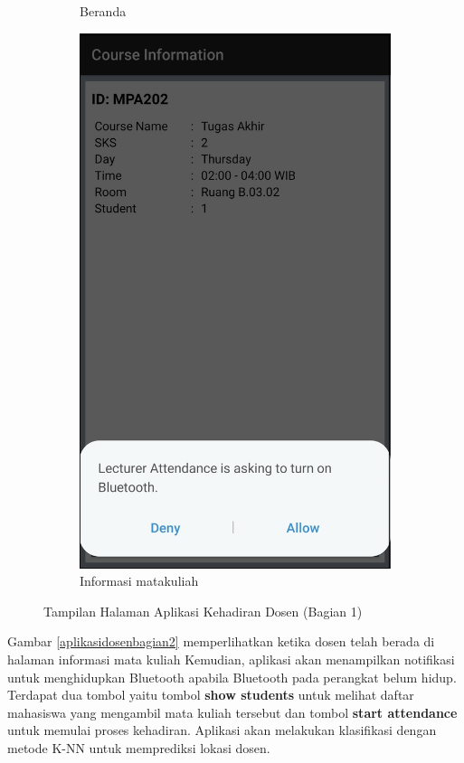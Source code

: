 \begin{enumerate}[a.]
\begin{enumerate}[a.]
\begin{figure} [H]
\begin{subfigure}{.5\textwidth}
			      \caption{Beranda}
		      \end{subfigure}
		      \begin{subfigure}{.5\textwidth}
			      \centering
			      \includegraphics[width=.5\linewidth]{gambar/android/dosen-4}
			      \caption{Informasi matakuliah}
		      \end{subfigure}
		      \vspace{0.5cm}
		      \caption{Tampilan Halaman Aplikasi Kehadiran Dosen (Bagian 1)}
		      \label{aplikasidosenbagian1}
	      \end{figure}

	      \vspace{0.5cm}
	      \par Gambar \ref{aplikasidosenbagian2} memperlihatkan ketika dosen telah berada di halaman informasi mata kuliah Kemudian, aplikasi akan menampilkan notifikasi untuk menghidupkan Bluetooth apabila Bluetooth pada perangkat belum hidup. Terdapat dua tombol yaitu tombol \textbf{show students} untuk melihat daftar mahasiswa yang mengambil mata kuliah tersebut dan tombol \textbf{start attendance} untuk memulai proses kehadiran. Aplikasi akan melakukan klasifikasi dengan metode K-NN untuk memprediksi lokasi dosen.


\end{enumerate}
\end{enumerate}
